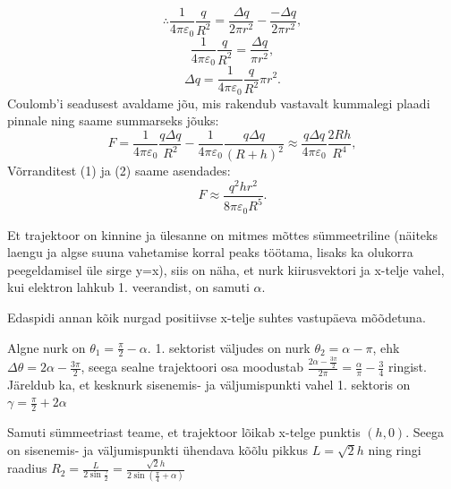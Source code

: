 \documentclass[10pt]{article}
\begin{document}
$$\therefore \frac{1}{4\pi \varepsilon_0} \frac{q}{R^2} = \frac{\Delta q}{2 \pi r^2} - \frac{-\Delta q}{2 \pi r^2},$$
$$\frac{1}{4\pi \varepsilon_0} \frac{q}{R^2} = \frac{\Delta q}{\pi r^2},$$
\begin{equation}
\Delta q = \frac{1}{4\pi \varepsilon_0} \frac{q}{R^2} \pi r^2.
\end{equation}
Coulomb'i seadusest avaldame jõu, mis rakendub vastavalt kummalegi plaadi pinnale ning saame summarseks jõuks:
\begin{equation}
F = \frac{1}{4 \pi \varepsilon_0} \frac{q \Delta q}{R^2} - \frac{1}{4 \pi \varepsilon_0} \frac{q \Delta q}{(R+h)^2} \approx \frac{q \Delta q}{4 \pi \varepsilon_0} \frac{2Rh}{R^4},
\end{equation}
Võrranditest (1) ja (2) saame asendades:
$$F \approx \frac{q^2 h r^2}{8 \pi \varepsilon_0 R^5}.$$
\probend
\bigskip


\solu
Et trajektoor on kinnine ja ülesanne on mitmes mõttes sümmeetriline (näiteks laengu ja algse suuna vahetamise korral peaks töötama, lisaks ka olukorra peegeldamisel üle sirge y=x), siis on näha, et nurk kiirusvektori ja x-telje vahel, kui elektron lahkub 1. veerandist, on samuti $\alpha$.

Edaspidi annan kõik nurgad positiivse x-telje suhtes vastupäeva mõõdetuna. 

Algne nurk on $\theta_1 = \frac{\pi}{2} - \alpha$. 1. sektorist väljudes on nurk $\theta_2 = \alpha - \pi$, ehk $\Delta\theta = 2\alpha - \frac{3\pi}{2}$, seega sealne trajektoori osa moodustab $\frac{2\alpha-\frac{3\pi}{2}}{2\pi} = \frac{\alpha}{\pi} - \frac{3}{4}$ ringist. Järeldub ka, et kesknurk sisenemis- ja väljumispunkti vahel 1. sektoris on $\gamma = \frac{\pi}{2} + 2\alpha$

Samuti sümmeetriast teame, et trajektoor lõikab x-telge punktis $(h,0)$. Seega on sisenemis- ja väljumispunkti ühendava kõõlu pikkus $L = \sqrt{2}h$ ning ringi raadius $R_2 = \frac{L}{2\sin{\frac{\gamma}{2}}} = \frac{\sqrt{2}h}{2\sin{(\frac{\pi}{4}+\alpha)}}$
\end{document}
